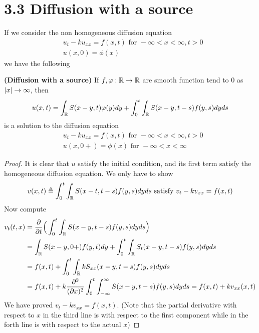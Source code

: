 \documentclass{report}
\begin{document}
\section{3.3 Diffusion with a source}
\begin{mdframed}
If we consider the non homogeneous diffusion equation 
\begin{align*}
  &u_t-ku_{xx}=f(x,t)\text{ for }-\infty < x < \infty , t>0 \\
  &u(x,0)=\phi (x)
\end{align*}
we have the following 
\end{mdframed}
\begin{theorem}
\textbf{(Diffusion with a source)} If $f,\varphi :\mathbb{R}\rightarrow \mathbb{R}$ are smooth function tend to $0$ as  $\left|x\right|\to \infty$, then 
\begin{align*}
u(x,t)=\int_{\mathbb{R}} S(x-y,t)\varphi (y)dy + \int_0^t \int_{\mathbb{R}}S(x-y,t-s)f(y,s)dyds
\end{align*}
is a solution to the diffusion equation 
\begin{align*}
&u_t-ku_{xx}=f(x,t)\text{ for }-\infty < x< \infty,t>0 \\
&u(x,0+)= \phi (x)\text{ for }-\infty < x < \infty 
\end{align*}
\end{theorem}
\begin{proof}
It is clear that $u$ satisfy the initial condition, and its first term satisfy the homogeneous diffusion equation. We only have to show 
\begin{align*}
v(x,t)\triangleq \int_0^t \int_{\mathbb{R}} S(x-t,t-s)f(y,s)dyds\text{ satisfy }v_t-kv_{xx} =f(x,t)
\end{align*}
Now compute 
\begin{align*}
v_t(t,x)&= \frac{\partial }{\partial t}\Big( \int_0^t \int_{\mathbb{R}}S(x-y,t-s)f(y,s)dyds \Big) \\
&=\int_{\mathbb{R}}S(x-y,0+)f(y,t)dy+\int_0^t \int_{\mathbb{R}}S_t(x-y,t-s) f(y,s)dyds \\
&= f(x,t) + \int_0^t \int_{\mathbb{R}} k S_{xx}(x-y,t-s)f(y,s)dyds\\
&=f(x,t)+ k \frac{\partial ^2}{(\partial x)^2} \int_0^t \int_{-\infty}^{\infty}S(x-y,t-s)f(y,s)dyds= f(x,t)+kv_{xx}(x,t)
\end{align*}
We have proved $v_t-kv_{xx}=f(x,t)$. (Note that the partial derivative with respect to $x$ in the third line is with respect to the first component while in the forth line is with respect to the actual  $x$)
\end{proof}
\end{document}
